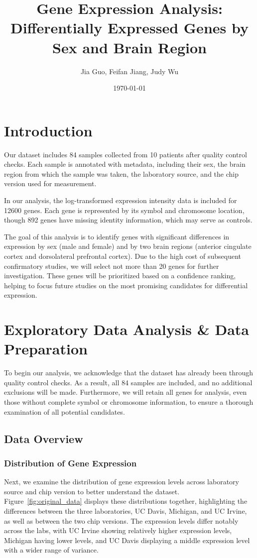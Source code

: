 \documentclass[12pt]{article}
\title{Gene Expression Analysis: Differentially Expressed Genes by Sex and Brain Region}
\author{Jia Guo, Feifan Jiang, Judy Wu}
\date{\today}
\begin{document}
\maketitle

\tableofcontents
\newpage

\section{Introduction}
Our dataset includes 84 samples collected from 10 patients after quality control checks. Each sample is annotated with metadata, including their sex, the brain region from which the sample was taken, the laboratory source, and the chip version used for measurement.

In our analysis, the log-transformed expression intensity data is included for 12600 genes. Each gene is represented by its symbol and chromosome location, though 892 genes have missing identity information, which may serve as controls. 

The goal of this analysis is to identify genes with significant differences in expression by sex (male and female) and by two brain regions (anterior cingulate cortex and dorsolateral prefrontal cortex). Due to the high cost of subsequent confirmatory studies, we will select not more than 20 genes for further investigation. These genes will be prioritized based on a confidence ranking, helping to focus future studies on the most promising candidates for differential expression.

\section{Exploratory Data Analysis \& Data Preparation}


To begin our analysis, we acknowledge that the dataset has already been through quality control checks. As a result, all 84 samples are included, and no additional exclusions will be made. Furthermore, we will retain all genes for analysis, even those without complete symbol or chromosome information, to ensure a thorough examination of all potential candidates.

\subsection{Data Overview}
    \subsubsection{Distribution of Gene Expression}
Next, we examine the distribution of gene expression levels across laboratory source and chip version to better understand the dataset. Figure~\ref{fig:original_data} displays these distributions together, highlighting the differences between the three laboratories, UC Davis, Michigan, and UC Irvine, as well as between the two chip versions. The expression levels differ notably across the labs, with UC Irvine showing relatively higher expression levels, Michigan having lower levels, and UC Davis displaying a middle expression level with a wider range of variance. 
\end{document}
